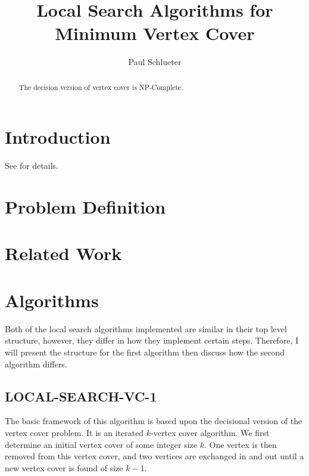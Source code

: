 \documentclass[sigconf]{acmart}
\begin{document}
\title{Local Search Algorithms for Minimum Vertex Cover}

\author{Paul Schlueter}

\begin{abstract}
The decision version of vertex cover is NP-Complete.
\end{abstract}


\maketitle
 
\section{Introduction} \label{sec:intro}
See \cite{cai2013numvc} for details.

\section{Problem Definition}

\section{Related Work}

\section{Algorithms}
Both of the local search algorithms implemented are similar in their top level structure, however, they differ in how they implement certain steps. Therefore, I will present the structure for the first algorithm then discuss how the second algorithm differs.
\subsection{LOCAL-SEARCH-VC-1}
The basic framework of this algorithm is based upon the decisional version of the vertex cover problem. It is an iterated $k$-vertex cover algorithm. We first determine an initial vertex cover of some integer size $k$. One vertex is then removed from this vertex cover, and two vertices are exchanged in and out until a new vertex cover is found of size $k - 1$.
\end{document}
